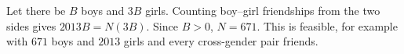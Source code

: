Let there be $B$ boys and $3B$ girls. Counting boy--girl friendships from the two sides gives $2013B=N(3B)$. Since $B>0$, $\boxed{N=671}$. This is feasible, for example with $671$ boys and $2013$ girls and every cross-gender pair friends.
